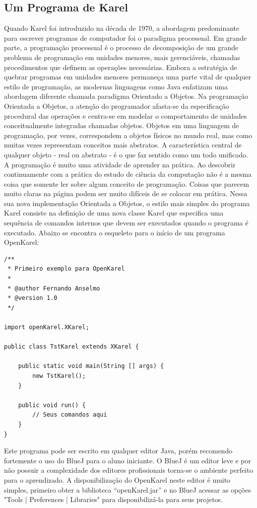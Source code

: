 \documentclass[a4paper,11pt]{article}
\begin{document}
\subsection{Um Programa de Karel}
Quando Karel foi introduzido na década de 1970, a abordagem predominante para escrever programas de computador foi o paradigma processual. Em grande parte, a programação processual é o processo de decomposição de um grande problema de programação em unidades menores, mais gerenciáveis, chamadas procedimentos que definem as operações necessárias. Embora a estratégia de quebrar programas em unidades menores permaneça uma parte vital de qualquer estilo de programação, as modernas linguagens como Java enfatizam uma abordagem diferente chamada paradigma Orientado a Objetos. Na programação Orientada a Objetos, a atenção do programador afasta-se da especificação procedural das operações e centra-se em modelar o comportamento de unidades conceitualmente integradas chamadas objetos. Objetos em uma linguagem de programação, por vezes, correspondem a objetos físicos no mundo real, mas como muitas vezes representam conceitos mais abstratos. A característica central de qualquer objeto - real ou abstrato - é o que faz sentido como um todo unificado. \\[3mm]
A programação é muito uma atividade de aprender na prática. Ao descobrir continuamente com a prática do estudo de ciência da computação não é a mesma coisa que somente ler sobre algum conceito de programação. Coisas que parecem muito claras na página podem ser muito difíceis de se colocar em prática. Nessa sua nova implementação Orientada a Objetos, o estilo mais simples do programa Karel consiste na definição de uma nova classe Karel que especifica uma sequência de comandos internos que devem ser executados quando o programa é executado. Abaixo se encontra o esqueleto para o início de um programa OpenKarel:
\begin{lstlisting}
/**
 * Primeiro exemplo para OpenKarel
 * 
 * @author Fernando Anselmo
 * @version 1.0
 */

import openKarel.XKarel;

public class TstKarel extends XKarel {

    public static void main(String [] args) {
        new TstKarel();
    }
    
    public void run() {
        // Seus comandos aqui
    }
}
\end{lstlisting}
Este programa pode ser escrito em qualquer editor Java, porém recomendo fortemente o uso do BlueJ\cite{bluej} para o aluno iniciante. O BlueJ é um editor leve e por não possuir a complexidade dos editores profissionais torna-se o ambiente perfeito para o aprendizado. A disponibilização do OpenKarel neste editor é muito simples, primeiro obter a biblioteca ``openKarel.jar'' e no BlueJ acessar as opções "Tools | Preferences | Libraries" para disponibilizá-la para seus projetos. \\[3mm]
\end{document}
